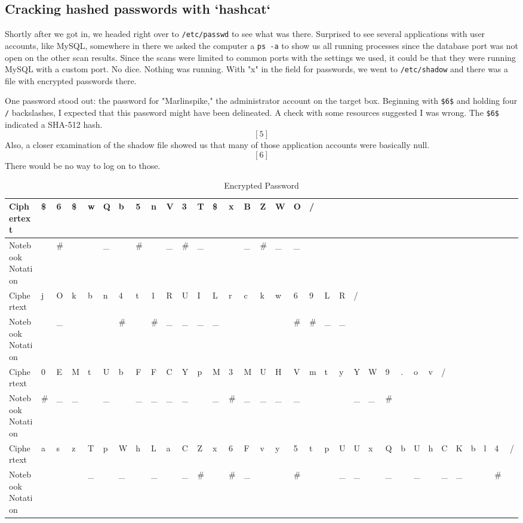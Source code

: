 \subsection{Cracking hashed passwords with `hashcat`}
Shortly after we got in, we headed right over to \texttt{/etc/passwd} to see what was there.  Surprised to see several applications with user accounts, like MySQL, somewhere in there we asked the computer a \texttt{ps -a} to show us all running processes since the \gls{database} \gls{port} was not open on the other scan results.  Since the scans were limited to common \gls{port}s with the settings we used, it could be that they were running MySQL with a custom \gls{port}.  No dice.  Nothing was running.  With "x" in the field for \gls{password}s, we went to \texttt{/etc/shadow} and there was a file with \gls{encrypt}ed \gls{password}s there.  



One password stood out:  the \gls{password} for "Marlinspike," the administrator account on the target box.  Beginning with \texttt{\$6\$} and holding four \texttt{/} backslashes, I expected that this \gls{password} might have been delineated.  A check with some resources suggested I was wrong. The \texttt{\$6\$} indicated a SHA-512 \gls{hash}. \[[5]\]  Also, a closer examination of the shadow file showed us that many of those application accounts were basically null. \[[6]\]  There would be no way to log on to those.  

\begin{table}[H]
\caption{Encrypted Password}
\centering
\begin{tabular}{|l|l|l|l|l|l|l|l|l|l|l|l|l|l|l|l|l|l|l|l|l|l|l|l|l|l|l|l|l|l|l|l|l|}
\hline
Ciphertext & \$ & 6 & \$ & w & Q & b & 5 & n & V & 3 & T & \$ & x & B & Z & W & O & / &  &  &  &  &  &  &  &  &  &  &  &  &  &  \\
\hline
Notebook Notation &  & \# &  &  & \_ &  & \# &  & \_ & \# & \_ &  &  & \_ & \# & \_ & \_ &  &  &  &  &  &  &  &  &  &  &  &  &  &  &  \\
Ciphertext & j & O & k & b & n & 4 & t & 1 & R & U & I & L & r & c & k & w & 6 & 9 & L & R & / &  &  &  &  &  &  &  &  &  &  &  \\
Notebook Notation &  & \_ &  &  &  & \# &  & \# & \_ & \_ & \_ & \_ &  &  &  &  & \# & \# & \_ & \_ &  &  &  &  &  &  &  &  &  &  &  &  \\
Ciphertext & 0 & E & M & t & U & b & F & F & C & Y & p & M & 3 & M & U & H & V & m & t & y & Y & W & 9 & . & o & v & / &  &  &  &  &  \\
Notebook Notation & \# & \_ & \_ &  & \_ &  & \_ & \_ & \_ & \_ &  & \_ & \# & \_ & \_ & \_ & \_ &  &  &  & \_ & \_ & \# &  &  &  &  &  &  &  &  &  \\
Ciphertext & a & s & z & T & p & W & h & L & a & C & Z & x & 6 & F & v & y & 5 & t & p & U & U & x & Q & b & U & h & C & K & b & l & 4 & / \\
Notebook Notation &  &  &  & \_ &  & \_ &  & \_ &  & \_ & \# &  & \# & \_ &  &  & \# &  &  & \_ & \_ &  & \_ &  & \_ &  & \_ & \_ &  &  & \# &  \\
\hline
\end{tabular}
\end{table}

